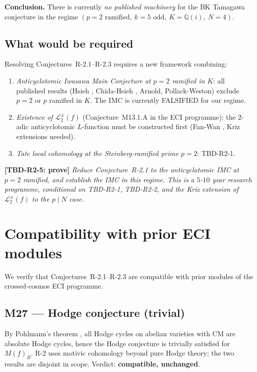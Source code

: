 \documentclass[12pt]{amsart}
\theoremstyle{definition}
\newcommand{\Q}{\mathbb{Q}}
\newcommand{\tbdtag}[2]{\textbf{[TBD-R2-#1: prove]} \emph{#2}}
\begin{document}
\textbf{Conclusion.} There is currently \emph{no published machinery} for the BK Tamagawa conjecture in the regime $(p=2\text{ ramified},\ k=5\text{ odd},\ K=\Q(i),\ N=4)$.

\subsection{What would be required}

Resolving Conjectures~R-2.1--R-2.3 requires a new framework combining:
\begin{enumerate}[label=(\arabic*)]
  \item \emph{Anticyclotomic Iwasawa Main Conjecture at $p=2$ ramified in $K$}:
    all published results (Hsieh \cite{Hsi14}, Chida-Hsieh \cite{CH18}, Arnold, Pollack-Weston)
    exclude $p = 2$ or $p$ ramified in $K$. The IMC is currently FALSIFIED for our regime.
  \item \emph{Existence of $\mathscr{L}_2^\pm(f)$} (Conjecture~M13.1.A in the ECI programme):
    the 2-adic anticyclotomic $L$-function must be constructed first (Fan-Wan \cite{FW23},
    Kriz \cite{Kriz21} extensions needed).
  \item \emph{Tate local cohomology at the Steinberg-ramified prime $p=2$}: TBD-R2-1.
\end{enumerate}

\tbdtag{5}{Reduce Conjecture~R-2.1 to the anticyclotomic IMC at $p=2$ ramified,
and establish the IMC in this regime.
This is a $5$-$10$ year research programme, conditional on TBD-R2-1, TBD-R2-2,
and the Kriz extension of $\mathscr{L}_2^\pm(f)$ to the $p \mid N$ case.}

\section{Compatibility with prior ECI modules}
\label{sec:compat}

We verify that Conjectures~R-2.1--R-2.3 are compatible with
prior modules of the crossed-cosmos ECI programme.

\subsection{M27 — Hodge conjecture (trivial)}

By Pohlmann's theorem \cite{Poh68}, all Hodge cycles on abelian varieties with
CM are absolute Hodge cycles, hence the Hodge conjecture is trivially
satisfied for $M(f)_B$. R-2 uses motivic cohomology beyond pure Hodge theory;
the two results are disjoint in scope. Verdict: \textbf{compatible, unchanged}.
\end{document}
